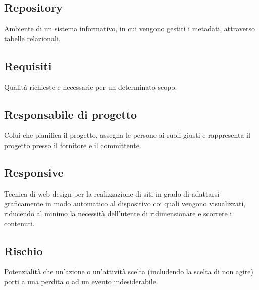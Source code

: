 \documentclass[../glossario.tex]{subfiles}
\begin{document}
\subsection*{Repository} 
Ambiente di un sistema informativo, in cui vengono gestiti i metadati, attraverso tabelle relazionali.

\subsection*{Requisiti} 
Qualità richieste e necessarie per un determinato scopo.

\subsection*{Responsabile di progetto} 
Colui che pianifica il progetto, assegna le persone ai ruoli giusti e rappresenta il progetto presso il fornitore e il committente.

\subsection*{Responsive} 
Tecnica di web design per la realizzazione di siti in grado di adattarsi graficamente in modo automatico al dispositivo coi quali vengono visualizzati, riducendo al minimo la necessità dell'utente di ridimensionare e scorrere i contenuti.

\subsection*{Rischio} 
Potenzialità che un'azione o un'attività scelta (includendo la scelta di non agire) porti a una perdita o ad un evento indesiderabile.



    
\end{document}
